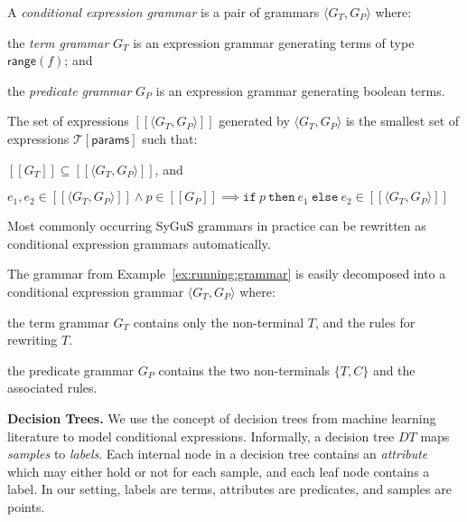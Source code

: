 \documentclass{llncs}
\newcommand\tuple[1]{\langle #1 \rangle}
\newcommand\Expr{e}
\newcommand\Pred{p}
\newcommand\Grammar{G}
\newcommand\sem[1]{[\![ #1 ]\!]}
\newcommand\SynthFun{f}
\newcommand\range{\mathsf{range}}
\newcommand\FormalParameters{\mathsf{params}}
\newcommand\Theory{\mathcal{T}}
\newcommand\ITE[3]{\mathtt{if}~#1~\mathtt{then}~#2~\mathtt{else}~#3}
\newcommand\DecisionTree{\mathit{DT}}
\newcommand{\sygus}{{\sffamily\fontsize{8.5}{10}\selectfont
    SyGuS}\xspace}
\renewcommand{\paragraph}[1]{\par\noindent\textbf{#1.}}
\begin{document}
A {\em conditional expression grammar} is a pair of grammars $\tuple{
\Grammar_T, \Grammar_P }$ where:
\begin{inparaenum}[(a)]
\item the {\em term grammar} $\Grammar_T$ is an expression grammar
  generating terms of type $\range(\SynthFun)$; and
\item the {\em predicate grammar} $\Grammar_P$ is an expression
  grammar generating boolean terms.
\end{inparaenum}
The set of expressions $\sem{\tuple{ \Grammar_T, \Grammar_P }}$
generated by $\tuple{ G_T, G_P }$ is the smallest set of expressions
$\Theory[\FormalParameters]$ such that:
\begin{inparaenum}[(a)]
\item $\sem{\Grammar_T} \subseteq \sem{\tuple{ \Grammar_T, \Grammar_P
  }}$, and
\item $\Expr_1, \Expr_2 \in \sem{\tuple{ \Grammar_T, \Grammar_P }}
  \wedge \Pred \in \sem{\Grammar_P} \implies
  \ITE{\Pred}{\Expr_1}{\Expr_2} \in \sem{\tuple{ \Grammar_T, \Grammar_P }}$
\end{inparaenum}
Most commonly occurring \sygus grammars in practice can be rewritten
as conditional expression grammars automatically.

\begin{example}
  The grammar from Example~\ref{ex:running:grammar} is easily decomposed
  into a conditional expression grammar $\tuple{\Grammar_T, \Grammar_P}$
  where:
  \begin{inparaenum}[(a)]
  \item the term grammar $\Grammar_T$ contains only the non-terminal
    $T$, and the rules for rewriting $T$.
  \item the predicate grammar $\Grammar_P$ contains the two
    non-terminals $\{ T, C \}$ and the associated rules.
  \end{inparaenum}
\end{example}

\paragraph{Decision Trees}
We use the concept of decision trees from machine learning literature to
model conditional expressions.
Informally, a decision tree $\DecisionTree$ maps {\em samples} to {\em
labels}.
Each internal node in a decision tree contains an {\em attribute} which
may either hold or not for each sample, and each leaf node contains a
label.
In our setting, labels are terms, attributes are predicates, and samples
are points.
\end{document}
